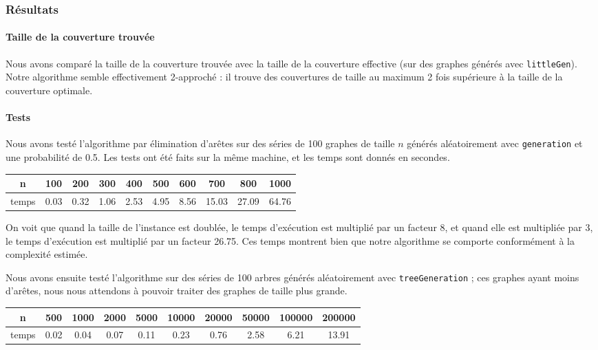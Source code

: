 \documentclass[a4paper,10pt]{article}
\begin{document}
\subsubsection{Résultats}

\paragraph{Taille de la couverture trouvée}

Nous avons comparé la taille de la couverture trouvée avec la taille de la couverture effective (sur des graphes générés avec \texttt{littleGen}). Notre algorithme semble effectivement 2-approché : il trouve des couvertures de taille au maximum 2 fois supérieure à la taille de la couverture optimale.

\paragraph{Tests}
Nous avons testé l'algorithme par élimination d'arêtes sur des séries de 100 graphes de taille $n$ générés aléatoirement avec \texttt{generation} et une probabilité de 0.5. Les tests ont été faits sur la même machine, et les temps sont donnés en secondes.

\begin{center}
\begin{tabular}{|c|c|c|c|c|c|c|c|c|c|}
	\hline 
	n & 100 & 200 & 300 & 400 & 500 & 600 & 700 & 800 & 1000 \\
	\hline
	temps & 0.03 & 0.32 & 1.06 & 2.53 & 4.95 & 8.56 & 15.03 & 27.09 & 64.76 \\
	\hline
\end{tabular}
\end{center}

On voit que quand la taille de l'instance est doublée, le temps d'exécution est multiplié par un facteur 8, et quand elle est multipliée par 3, le temps d'exécution est multiplié par un facteur 26.75.
Ces temps montrent bien que notre algorithme se comporte conformément à la complexité estimée.

\bigskip
Nous avons ensuite testé l'algorithme sur des séries de 100 arbres générés aléatoirement avec \texttt{treeGeneration} ; ces graphes ayant moins d'arêtes, nous nous attendons à pouvoir traiter des graphes de taille plus grande.

\begin{center}
\begin{tabular}{|c|c|c|c|c|c|c|c|c|c|}
	\hline 
	n & 500 & 1000 & 2000 & 5000 & 10000 & 20000 & 50000 & 100000 & 200000\\
	\hline
	temps & 0.02 & 0.04 & 0.07 & 0.11 & 0.23 & 0.76 & 2.58 & 6.21 & 13.91\\
	\hline
\end{tabular}
\end{center}
\end{document}
